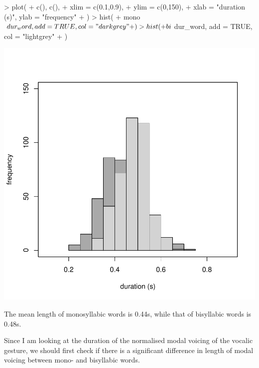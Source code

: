 \documentclass[a4paper,11pt]{article}
\begin{document}
\begin{Schunk}
\begin{Sinput}
> plot(
+     c(), c(),
+     xlim = c(0.1,0.9),
+     ylim = c(0,150),
+     xlab = "duration (s)", ylab = "frequency"
+ )
> hist(
+     mono$dur_word, add = TRUE, col = "darkgrey"
+ )
> hist(
+     bi$dur_word, add = TRUE, col = "lightgrey"
+ )
\end{Sinput}
\end{Schunk}
\includegraphics{analysis-004}

The mean length of monosyllabic words is 0.44s, while that of bisyllabic words is 0.48s.

Since I am looking at the duration of the normalised modal voicing of the vocalic gesture, we should first check if there is a significant difference in length of modal voicing between mono- and bisyllabic words.
\end{document}
